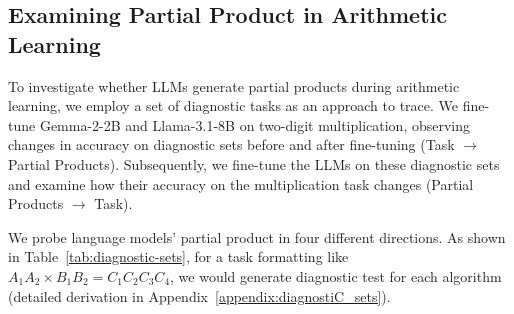 \documentclass[11pt]{article}
\begin{document}
\subsection{Examining Partial Product in Arithmetic Learning}
To investigate whether LLMs generate partial products during arithmetic learning, we employ a set of diagnostic tasks as an approach to trace. We fine-tune Gemma-2-2B and Llama-3.1-8B on two-digit multiplication, observing changes in accuracy on diagnostic sets before and after fine-tuning (Task $\rightarrow$ Partial Products). Subsequently, we fine-tune the LLMs on these diagnostic sets and examine how their accuracy on the multiplication task changes (Partial Products $\rightarrow$ Task).
\begin{table}[!h]
\vspace{-0.2cm}
\centering
\small
{}
\caption{Diagnostic sets with four calculation methods.}
\label{tab:diagnostic-sets}
\vspace{-0.2cm}
\end{table}

We probe language models' partial product in four different directions. As shown in Table~\ref{tab:diagnostic-sets}, for a task formatting like $A_1A_2 \times B_1B_2 = C_1C_2C_3C_4 $, we would generate diagnostic test for each algorithm (detailed derivation in Appendix~\ref{appendix:diagnostiC_sets}).
\end{document}
